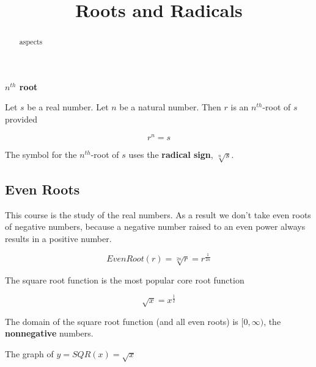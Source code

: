 \documentclass{ximera}
\title{Roots and Radicals}
\begin{document}
\begin{abstract}
aspects
\end{abstract}
\maketitle




\begin{idea} \item \textbf{\textcolor{blue!55!black}{$n^{th}$ root}}


Let $s$ be a real number. Let $n$ be a natural number.  Then $r$ is an $n^{th}$-root of $s$ provided


\[    r^n = s     \]



The symbol for the $n^{th}$-root of $s$ uses the \textbf{radical sign}, $\sqrt[n]{s}$.

\end{idea}





\subsection*{Even Roots}

This course is the study of the real numbers. As a result we don't take even roots of negative numbers, because a negative number raised to an even power always results in a positive number.



\[   EvenRoot(r) = \sqrt[2n]{r} = r^{\tfrac{1}{2n}}          \]

The square root function is the most popular core root function


\[   \sqrt{x} = x^{\tfrac{1}{2}}          \]



The domain of the square root function (and all even roots) is $[0, \infty)$, the \textbf{nonnegative} numbers.  






The graph of $y = SQR(x) = \sqrt{x}$
\end{document}

